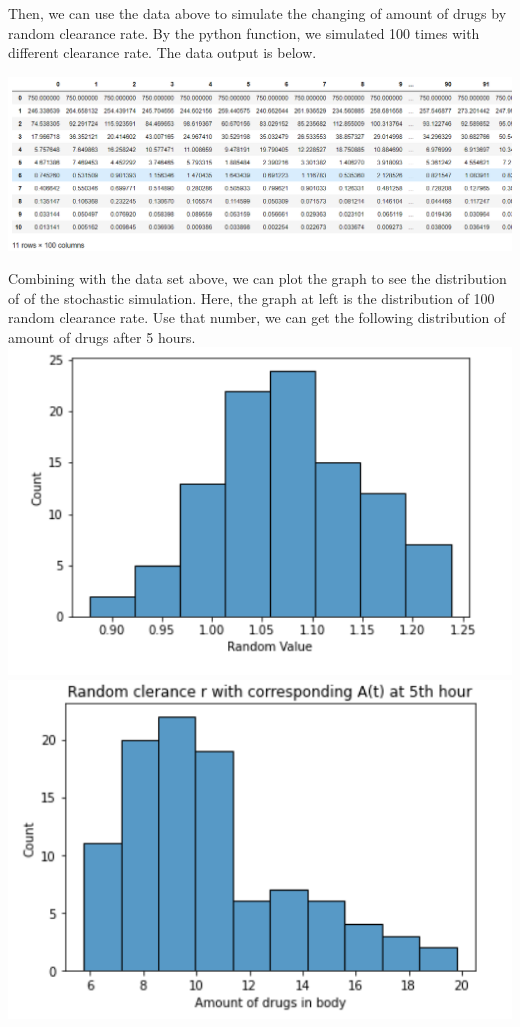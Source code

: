 \documentclass{article}
\begin{document}
Then, we can use the data above to simulate the changing of amount of drugs by random clearance rate. By the python function, we simulated 100 times with different clearance rate. The data output is below.\\
\begin{center}
\includegraphics[scale = 0.47]{100Simulations.png}    
\end{center}
Combining with the data set above, we can plot the graph to see the distribution of of the stochastic simulation. Here, the graph at left is the distribution of 100 random clearance rate. Use that number, we can get the following distribution of amount of drugs after 5 hours. \\
\includegraphics[scale = 0.5]{frequency distribution.png}
\includegraphics[scale = 0.5]{Distribution.png}
\end{document}
